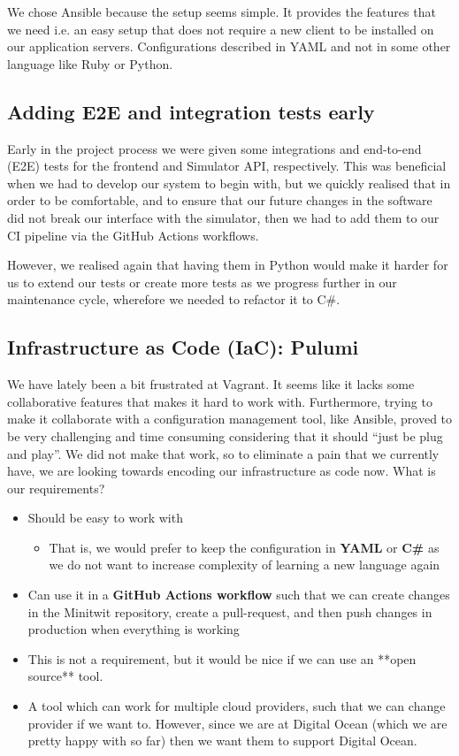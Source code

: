 We chose Ansible because the setup seems simple. It provides the features that we need i.e. an easy setup that does not require a new client to be installed on our application servers. Configurations described in YAML and not in some other language like Ruby or Python.

\subsection{Adding E2E and integration tests early}

Early in the project process we were given some integrations and end-to-end (E2E) tests for the frontend and Simulator API, respectively. This was beneficial when we had to develop our system to begin with, but we quickly realised that in order to be comfortable, and to ensure that our future changes in the software did not break our interface with the simulator, then we had to add them to our CI pipeline via the GitHub Actions workflows.

However, we realised again that having them in Python would make it harder for us to extend our tests or create more tests as we progress further in our maintenance cycle, wherefore we needed to refactor it to C\#.

\subsection{Infrastructure as Code (IaC): Pulumi}

We have lately been a bit frustrated at Vagrant. It seems like it lacks some collaborative features that makes it hard to work with. Furthermore, trying to make it collaborate with a configuration management tool, like Ansible, proved to be very challenging and time consuming considering that it should “just be plug and play”. We did not make that work, so to eliminate a pain that we currently have, we are looking towards encoding our infrastructure as code now. What is our requirements?

\begin{itemize}
    \item Should be easy to work with
    \begin{itemize}
        \item That is, we would prefer to keep the configuration in \textbf{YAML} or \textbf{C\#} as we do not want to increase complexity of learning a new language again
    \end{itemize}
    \item Can use it in a \textbf{GitHub Actions workflow} such that we can create changes in the Minitwit repository, create a pull-request, and then push changes in production when everything is working
    \item This is not a requirement, but it would be nice if we can use an **open source** tool.
    \item A tool which can work for multiple cloud providers, such that we can change provider if we want to. However, since we are at Digital Ocean (which we are pretty happy with so far) then we want them to support Digital Ocean.
\end{itemize}

